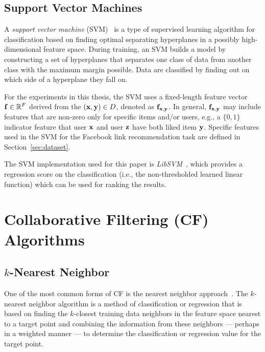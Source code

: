 \subsection{Support Vector Machines}
\label{sec:svm}

A \emph{support vector machine} (SVM)~\cite{svms} is a type of supervised
learning algorithm for classification based on finding optimal separating
hyperplanes in a possibly high-dimensional feature space.  During
training, an SVM builds a model by constructing a set of hyperplanes
that separates one class of data from another class with the maximum
margin possible.  Data are classified by finding out on which side of
a hyperplane they fall on.

For the experiments in this thesis, the SVM uses a fixed-length
feature vector $\mathbf{f} \in \mathbb{R}^F$ derived from the $(\mathbf{x},\mathbf{y}) \in D$,
denoted as $\mathbf{f}_{\mathbf{x},\mathbf{y}}$.  
In general, $\mathbf{f}_{\mathbf{x},\mathbf{y}}$ may include features that are
non-zero only for specific items and/or users, e.g., a $\{0,1\}$
indicator feature that user $\mathbf{x}$ and user $\mathbf{z}$ have both liked item
$\mathbf{y}$.  Specific features used in the SVM for the Facebook link recommendation
task are defined in Section~\ref{sec:dataset}.

The SVM implementation used for this paper is
\emph{LibSVM}~\cite{libsvm}, which provides a regression score on the
classification (i.e., the non-thresholded learned linear function) 
which can be used for ranking the results.

\section{Collaborative Filtering (CF) Algorithms}

\subsection{$k$-Nearest Neighbor}
\label{sec:nn}

One of the most common forms of CF is the nearest neighbor
approach~\cite{bellkor}. The $k$-nearest neighbor algorithm is a
method of classification or regression that is based on finding the $k$-closest
training data neighbors in the feature space nearest to a target point and combining the information from these neighbors --- perhaps
in a weighted manner --- to determine the classification or regression value
for the target point. 


